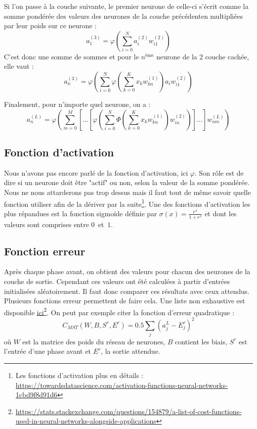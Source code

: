 	\pagebreak
	\noindent Si l'on passe à la couche suivante, le premier neurone de celle-ci s'écrit comme la somme pondérée des valeurs des neurones de la couche précédenten multipliées par leur poids sur ce neurone : 
	$$a_1^{(3)}  = \varphi\left(\sum_{i=0}^{N}a_i^{(2)}w_{i1}^{(2)}\right)$$
	C'est donc une somme de sommes et pour le $n^{\text{ème}}$ neurone de la 2\ieme{} couche cachée, elle vaut :
	$$a_n^{(3)} = \varphi\left(\sum_{i=0}^{N}\varphi\left(\sum_{k=0}^{K}x_kw_{kn}^{(1)}\right)a_i w_{i1}^{(2)}\right)$$
	
	\noindent Finalement, pour n'importe quel neurone, on a :
	$$ a_n^{(L)} = \varphi\left(\sum_{m=0}^{M}\left[...\left[\varphi\left(\sum_{i=0}^{N}\varPhi\left(\sum_{k=0}^{K}x_kw_{kn}^{(1)}\right)w_{in}^{(2)}\right)\right]...\right]w_{nm}^{(L)}\right) $$
	
	
\subsection{Fonction d'activation}
	Nous n'avons pas encore parlé de la fonction d'activation, ici $\varphi$. Son rôle est de dire si un neurone doit être "actif" ou non, selon la valeur de la somme pondérée. Nous ne nous attarderons pas trop dessus mais il faut tout de même savoir quelle fonction utiliser afin de la dériver par la suite\footnote{Les fonctions d'activation plus en détails : \url{https://towardsdatascience.com/activation-functions-neural-networks-1cbd9f8d91d6}}. Une des fonctions d'activation les plus répandues est la fonction sigmoïde définie par $\sigma(x) = \frac{e^x}{1+e^x}$ et dont les valeurs sont comprises entre \mbox{$0$ et $1$.}
		
\subsection{Fonction erreur}
	Après chaque phase avant, on obtient des valeurs pour chacun des neurones de la couche de sortie. Cependant ces valeurs ont été calculées à partir d'entrées initialisées aléatoirement. Il faut donc comparer ces résultats avec ceux attendus. Plusieurs fonctions erreur permettent de faire cela. Une liste non exhaustive est disponible \href{https://stats.stackexchange.com/questions/154879/a-list-of-cost-functions-used-in-neural-networks-alongside-applications}{ici}\footnote{\url{https://stats.stackexchange.com/questions/154879/a-list-of-cost-functions-used-in-neural-networks-alongside-applications}}. On peut par exemple citer la fonction d'erreur quadratique : 
	$$C_{MST}(W, B, S^r, E^r) = 0.5\sum\limits_j (a^L_j - E^r_j)^2$$
	où $W$ est la matrice des poids du réseau de neurones, $B$ contient les biais, $S^r$ est l'entrée d'une phase avant et $E^r$, la sortie attendue.\\
	
